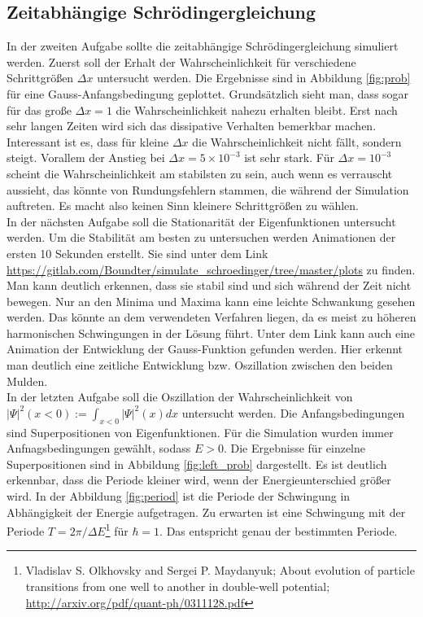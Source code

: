 \documentclass[a4paper, 11pt]{scrartcl}
\begin{document}
\subsection{Zeitabhängige Schrödingergleichung}
In der zweiten Aufgabe sollte die zeitabhängige Schrödingergleichung simuliert werden. Zuerst soll der Erhalt der Wahrscheinlichkeit für verschiedene Schrittgrößen $\Delta x$ untersucht werden. Die Ergebnisse sind in Abbildung \ref{fig:prob} für eine Gauss-Anfangsbedingung geplottet. Grundsätzlich sieht man, dass sogar für das große $\Delta x = 1$ die Wahrscheinlichkeit nahezu erhalten bleibt. Erst nach sehr langen Zeiten wird sich das dissipative Verhalten bemerkbar machen.\\
Interessant ist es, dass für kleine $\Delta x$ die Wahrscheinlichkeit nicht fällt, sondern steigt. Vorallem der Anstieg bei $\Delta x = 5 \times 10^{-3}$ ist sehr stark. Für $\Delta x = 10^{-3}$ scheint die Wahrscheinlichkeit am stabilsten zu sein, auch wenn es verrauscht aussieht, das könnte von Rundungsfehlern stammen, die während der Simulation auftreten. Es macht also keinen Sinn kleinere Schrittgrößen zu wählen.\\
In der nächsten Aufgabe soll die Stationarität der Eigenfunktionen untersucht werden. Um die Stabilität am besten zu untersuchen werden Animationen der ersten 10 Sekunden erstellt. Sie sind unter dem Link \url{https://gitlab.com/Boundter/simulate_schroedinger/tree/master/plots} zu finden. Man kann deutlich erkennen, dass sie stabil sind und sich während der Zeit nicht bewegen. Nur an den Minima und Maxima kann eine leichte Schwankung gesehen werden. Das könnte an dem verwendeten Verfahren liegen, da es meist zu höheren harmonischen Schwingungen in der Lösung führt. Unter dem Link kann auch eine Animation der Entwicklung der Gauss-Funktion gefunden werden. Hier erkennt man deutlich eine zeitliche Entwicklung bzw. Oszillation zwischen den beiden Mulden.\\
In der letzten Aufgabe soll die Oszillation der Wahrscheinlichkeit von ${\vert \Psi \vert^2 (x < 0) := \int_{x < 0} \vert \Psi \vert^2 (x) dx}$ untersucht werden. Die Anfangsbedingungen sind Superpositionen von Eigenfunktionen. Für die Simulation wurden immer Anfnagsbedingungen gewählt, sodass $E > 0$. Die Ergebnisse für einzelne Superpositionen sind in Abbildung \ref{fig:left_prob} dargestellt. Es ist deutlich erkennbar, dass die Periode kleiner wird, wenn der Energieunterschied größer wird. In der Abbildung \ref{fig:period} ist die Periode der Schwingung in Abhängigkeit der Energie aufgetragen. Zu erwarten ist eine Schwingung mit der Periode $T = 2 \pi/ \Delta E$\footnote{Vladislav S. Olkhovsky and Sergei P. Maydanyuk; About evolution of particle transitions from one well to another in double-well potential; \url{http://arxiv.org/pdf/quant-ph/0311128.pdf}} für $\hbar = 1$. Das entspricht genau der bestimmten Periode.
\end{document}
